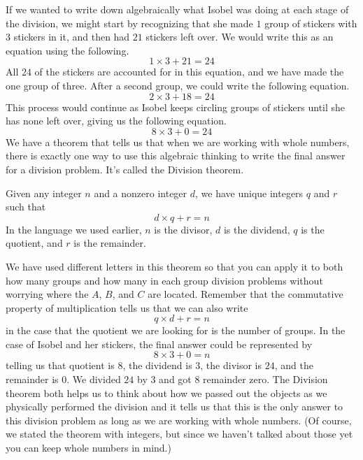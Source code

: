 \documentclass{ximera}
\begin{document}
If we wanted to write down algebraically what Isobel was doing at each stage of the division, we might start by recognizing that she made $1$ group of stickers with $3$ stickers in it, and then had $21$ stickers left over. We would write this as an equation using the following.
\[
1 \times 3 + 21 = 24
\]
All $24$ of the stickers are accounted for in this equation, and we have made the one group of three. After a second group, we could write the following equation.
\[
2 \times 3 + 18 = 24
\]
This process would continue as Isobel keeps circling groups of stickers until she has none left over, giving us the following equation.
\[
8 \times 3 + 0 = 24
\]
We have a theorem that tells us that when we are working with whole numbers, there is exactly one way to use this algebraic thinking to write the final answer for a division problem. It's called the Division theorem.
\begin{theorem}
Given any integer $n$ and a nonzero integer $d$, we have unique integers $q$ and $r$ such that 
\[
d \times q + r = n
\]
In the language we used earlier, $n$ is the divisor, $d$ is the dividend, $q$ is the quotient, and $r$ is the remainder.
\end{theorem}
We have used different letters in this theorem so that you can apply it to both how many groups and how many in each group division problems without worrying where the $A$, $B$, and $C$ are located. Remember that the commutative property of multiplication tells us that we can also write 
\[q \times d + r = n
\]
in the case that the quotient we are looking for is the number of groups. In the case of Isobel and her stickers, the final answer could be represented by 
\[
8 \times 3 + 0 = n
\]
telling us that quotient is $8$, the dividend is $3$, the divisor is $24$, and the remainder is $0$. We divided $24$ by $3$ and got $8$ remainder zero. The Division theorem both helps us to think about how we passed out the objects as we physically performed the division and it tells us that this is the only answer to this division problem as long as we are working with whole numbers. (Of course, we stated the theorem with integers, but since we haven't talked about those yet you can keep whole numbers in mind.)
\end{document}
